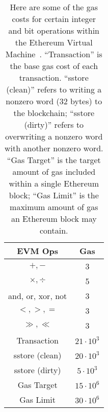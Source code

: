 \begin{table}[pt]
\centering
\begin{tabular}{|c|c|}
\hline
EVM Ops & Gas \\
\hline
    $+,-$ & 3 \\
    $\times,\div$ & 5 \\
    \textsf{and}, \textsf{or}, \textsf{xor}, \textsf{not} & 3 \\
    $<,>,=$ & 3 \\
    $\gg,\ll$ & 3 \\
\hline
    Transaction & $21\cdot10^{3}$ \\
    \textsf{sstore} (clean) & $20\cdot10^{3}$ \\
    \textsf{sstore} (dirty) &  $5\cdot10^{3}$ \\
    Gas Target  & $15\cdot10^{6}$ \\
    Gas Limit   & $30\cdot10^{6}$ \\
\hline
\end{tabular}
\caption[EVM Gas Costs]{Here are some
    of the gas costs for certain integer and bit operations within the
    Ethereum Virtual Machine~\cite{BlockSizesGasLimits,EthereumYellowpaper}.
    ``Transaction'' is the base gas cost of each transaction.
    ``\textsf{sstore} (clean)'' refers to writing a nonzero word
    (32 bytes) to the blockchain;
    ``\textsf{sstore} (dirty)'' refers to overwriting a nonzero word
    with another nonzero word.
    ``Gas Target'' is the target amount of gas
    included within a single Ethereum block;
    ``Gas Limit'' is the maximum amount of gas
    an Ethereum block may contain.
    }
\label{table:evm_gas}
\end{table}
